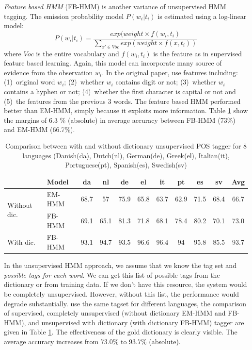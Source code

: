 \textit{Feature based HMM} (FB-HMM) \cite{featurebaseHMM} is another variance of unsupervised HMM tagging. The emission probability model $P(w_i|t_i)$ is estimated using a log-linear model:
$$P(w_i|t_i) = \frac{exp(weight \times f(w_i,t_i)}{\sum_{x' \in Voc} exp (weight \times f(x,t_i))}$$
where $Voc$ is the entire vocabulary and $f(w_i,t_i)$ is the feature as in supervised feature based learning. Again, this model can incorporate many source of evidence from the observation $w_i$. In the original paper,  use features including: (1)~original word $w_i$; (2)~whether $w_i$ contains digit or not; (3)~whether $w_i$ contains a hyphen or not; (4)~whether the first character is capital or not and (5)~the features from the previous 3 words. The feature based HMM performed better than EM-HMM, simply because it exploits more information. Table \ref{tab:superviseUnsupervise} show the margins of 6.3 \% (absolute) in average accuracy between FB-HMM (73\%) and EM-HMM (66.7\%).

\begin{table}
\tiny
  \centering
    \begin{tabular}{lp{2cm}|cccccccc|c}
    
    &Model & da & nl & de & el & it & pt & es & sv & \textbf{Avg} \\
    \hline

    \multirow{2}{*}{Without dic.} & EM-HMM  & 68.7  & 57    & 75.9  & 65.8  & 63.7  & 62.9  & 71.5  & 68.4  & 66.7 \\

    & FB-HMM &69.1& 65.1 &81.3 &71.8 &68.1& 78.4& 80.2 &70.1 &73.0\\
    \hline
    With dic. & FB-HMM & 93.1  & 94.7  & 93.5  & 96.6  & 96.4  & 94    & 95.8  & 85.5  & 93.7 \\
    \end{tabular}
  \caption{Comparison between with and without dictionary unsupervised POS tagger for 8 languages (Danish(da), Dutch(nl), German(de), Greek(el), Italian(it), Portuguese(pt), Spanish(es), Swedish(sv) }  
  \label{tab:superviseUnsupervise}
\end{table}


In the unsupervised HMM approach, we assume that we know the tag set and \textit{possible tags for each word}. We can get this list of possible tags from the dictionary or from training data. If we don't have this resource, the system would be completely unsupervised. However, without this list, the performance would degrade substantially.  use the same tagset for different languages, the comparison of supervised, completely unsupervised (without dictionary EM-HMM and FB-HMM), and unsupervised with dictionary (with dictionary FB-HMM) tagger are given in Table \ref{tab:superviseUnsupervise}. The effectiveness of the gold dictionary is clearly visible. The average accuracy increases from 73.0\% to 93.7\% (absolute). 

